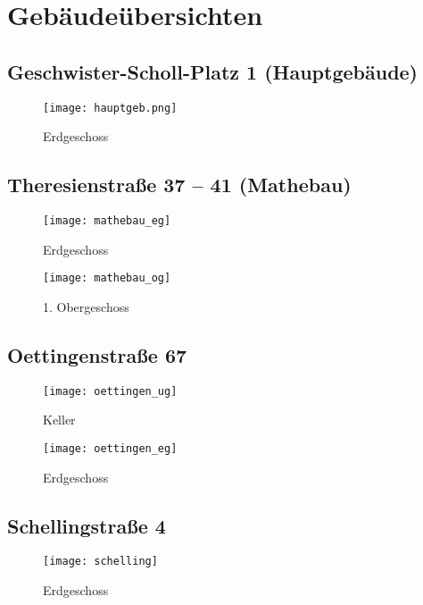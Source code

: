 ﻿
\chapter{Gebäudeübersichten}


\section*{Geschwister-Scholl-Platz 1 (Hauptgebäude)}
\begin{figure}[H]
	\centering
	\texttt{[image: hauptgeb.png]}
	\caption{Erdgeschoss}
\end{figure}

\section*{Theresienstraße 37 -- 41 (Mathebau)}
\begin{figure}[H]
	\centering%
	\begin{minipage}{.5\textwidth}
		\centering
		\texttt{[image: mathebau\_eg]}
		\caption{Erdgeschoss}
	\end{minipage}%
	\begin{minipage}{.5\textwidth}
		\centering
		\texttt{[image: mathebau\_og]}
		\caption{1. Obergeschoss}
	\end{minipage}
\end{figure}

\section*{Oettingenstraße 67\subjectList{\subjectMI{}\subjectI{}}}
\begin{figure}[H]
	\centering%
	\begin{minipage}{.5\textwidth}
		\centering
		\texttt{[image: oettingen\_ug]}
		\caption{Keller}
	\end{minipage}%
	\begin{minipage}{.5\textwidth}
		\centering
		\texttt{[image: oettingen\_eg]}
		\caption{Erdgeschoss}
	\end{minipage}
\end{figure}

\section*{Schellingstraße 4\subjectList{\subjectP{}}}
\begin{figure}[H]
	\centering
	\texttt{[image: schelling]}
	\caption{Erdgeschoss}
\end{figure}
